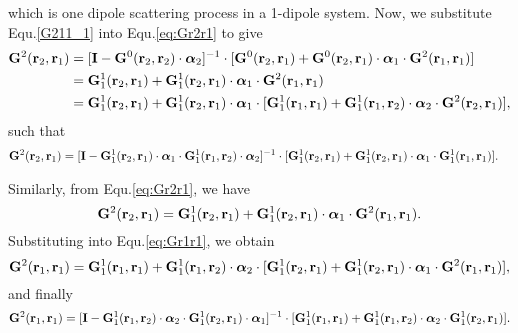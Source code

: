 which is one dipole scattering process in a 1-dipole system.
Now, we substitute Equ.\eqref{G211_1} into Equ.\eqref{eq:Gr2r1} to give
\begin{align}
\mathbf{G}^2(\mathbf{r}_2,\mathbf{r}_1) &= [\mathbf{I}-\mathbf{G}^0(\mathbf{r}_2,\mathbf{r}_2)\cdot {\bm \alpha}_2]^{-1}\cdot [\mathbf{G}^0(\mathbf{r}_2,\mathbf{r}_1)+\mathbf{G}^0(\mathbf{r}_2,\mathbf{r}_1)\cdot {\bm \alpha}_1\cdot \mathbf{G}^2(\mathbf{r}_1,\mathbf{r}_1)] \\
 &= \mathbf{G}^1_1(\mathbf{r}_2,\mathbf{r}_1)+\mathbf{G}^1_1(\mathbf{r}_2,\mathbf{r}_1)\cdot{\bm \alpha}_1\cdot \mathbf{G}^2(\mathbf{r}_1,\mathbf{r}_1)\\
 &=\mathbf{G}^1_1(\mathbf{r}_2,\mathbf{r}_1)+\mathbf{G}^1_1(\mathbf{r}_2,\mathbf{r}_1)\cdot{\bm \alpha}_1\cdot [\mathbf{G}^1_1(\mathbf{r}_1,\mathbf{r}_1)+\mathbf{G}^1_1(\mathbf{r}_1,\mathbf{r}_2)\cdot{\bm \alpha}_2\cdot \mathbf{G}^2(\mathbf{r}_2,\mathbf{r}_1)],
\end{align}
such that
\begin{align}
\mathbf{G}^2(\mathbf{r}_2,\mathbf{r}_1) &= [\mathbf{I}-\mathbf{G}^1_1(\mathbf{r}_2,\mathbf{r}_1)\cdot {\bm \alpha}_1\cdot \mathbf{G}^1_1(\mathbf{r}_1,\mathbf{r}_2)\cdot {\bm \alpha}_2]^{-1}\cdot [\mathbf{G}^1_1(\mathbf{r}_2,\mathbf{r}_1)+\mathbf{G}^1_1(\mathbf{r}_2,\mathbf{r}_1)\cdot {\bm \alpha}_1\cdot \mathbf{G}^1_1(\mathbf{r}_1,\mathbf{r}_1)]. \label{G221_2}
\end{align}

Similarly, from Equ.\eqref{eq:Gr2r1}, we have
\begin{equation}
\mathbf{G}^2(\mathbf{r}_2,\mathbf{r}_1) =\mathbf{G}^1_1(\mathbf{r}_2,\mathbf{r}_1)+\mathbf{G}^1_1(\mathbf{r}_2,\mathbf{r}_1)\cdot {\bm \alpha}_1 \cdot \mathbf{G}^2(\mathbf{r}_1,\mathbf{r}_1).
\end{equation}
Substituting into Equ.\eqref{eq:Gr1r1}, we obtain
\begin{equation}
\mathbf{G}^2(\mathbf{r}_1,\mathbf{r}_1)=\mathbf{G}^1_1(\mathbf{r}_1,\mathbf{r}_1)+\mathbf{G}^1_1(\mathbf{r}_1,\mathbf{r}_2)\cdot {\bm \alpha}_2\cdot [\mathbf{G}^1_1(\mathbf{r}_2,\mathbf{r}_1)+\mathbf{G}^1_1(\mathbf{r}_2,\mathbf{r}_1)\cdot {\bm \alpha}_1 \cdot \mathbf{G}^2(\mathbf{r}_1,\mathbf{r}_1)],
\end{equation}
and finally
\begin{equation}
\label{G211_2}
\bG^2(\br_1,\br_1)=[\eye-\bG^1_1(\br_1,\br_2)\cdot \balpha_2\cdot \bG^1_1(\br_2,\br_1)\cdot\balpha_1]^{-1}\cdot [\bG^1_1(\br_1,\br_1)+ \bG^1_1(\br_1,\br_2)\cdot \balpha_2\cdot \bG^1_1(\br_2,\br_1)].
\end{equation}

